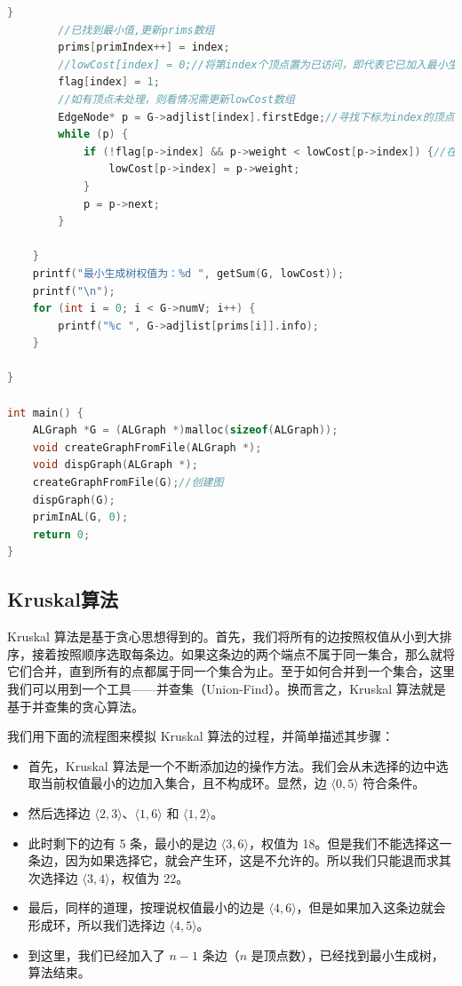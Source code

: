 \documentclass[lang=cn,newtx,10pt,scheme=chinese]{elegantbook}
\begin{document}
\begin{lstlisting}[language=C++, caption={Prim算法}]
		}
		//已找到最小值,更新prims数组
		prims[primIndex++] = index;
		//lowCost[index] = 0;//将第index个顶点置为已访问，即代表它已加入最小生成树
		flag[index] = 1;
		//如有顶点未处理，则看情况需更新lowCost数组
		EdgeNode* p = G->adjlist[index].firstEdge;//寻找下标为index的顶点可到达的顶点
		while (p) {
			if (!flag[p->index] && p->weight < lowCost[p->index]) {//在index处的旧值大于我们加入新节点后的
				lowCost[p->index] = p->weight;
			}
			p = p->next;
		}
		
	}
	printf("最小生成树权值为：%d ", getSum(G, lowCost));
	printf("\n");
	for (int i = 0; i < G->numV; i++) {
		printf("%c ", G->adjlist[prims[i]].info);
	}

}

int main() {
	ALGraph *G = (ALGraph *)malloc(sizeof(ALGraph));
	void createGraphFromFile(ALGraph *);
	void dispGraph(ALGraph *);
	createGraphFromFile(G);//创建图
	dispGraph(G);
	primInAL(G, 0);
	return 0;
}
\end{lstlisting}
\subsection{Kruskal算法}
Kruskal 算法是基于贪心思想得到的。首先，我们将所有的边按照权值从小到大排序，接着按照顺序选取每条边。如果这条边的两个端点不属于同一集合，那么就将它们合并，直到所有的点都属于同一个集合为止。至于如何合并到一个集合，这里我们可以用到一个工具——并查集（Union-Find）。换而言之，Kruskal 算法就是基于并查集的贪心算法。

我们用下面的流程图来模拟 Kruskal 算法的过程，并简单描述其步骤：

\begin{itemize}
  \item 首先，Kruskal 算法是一个不断添加边的操作方法。我们会从未选择的边中选取当前权值最小的边加入集合，且不构成环。显然，边 $\langle 0, 5 \rangle$ 符合条件。
  \item 然后选择边 $\langle 2, 3 \rangle$、$\langle 1, 6 \rangle$ 和 $\langle 1, 2 \rangle$。
  \item 此时剩下的边有 5 条，最小的是边 $\langle 3, 6 \rangle$，权值为 18。但是我们不能选择这一条边，因为如果选择它，就会产生环，这是不允许的。所以我们只能退而求其次选择边 $\langle 3, 4 \rangle$，权值为 22。
  \item 最后，同样的道理，按理说权值最小的边是 $\langle 4, 6 \rangle$，但是如果加入这条边就会形成环，所以我们选择边 $\langle 4, 5 \rangle$。
  \item 到这里，我们已经加入了 $n-1$ 条边（$n$ 是顶点数），已经找到最小生成树，算法结束。
\end{itemize}
\end{document}
